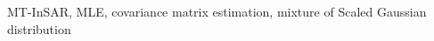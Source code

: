 \begin{IEEEkeywords}
    \acl{MT-InSAR}, \acl{MLE}, covariance matrix estimation, mixture of Scaled Gaussian distribution
\end{IEEEkeywords}
